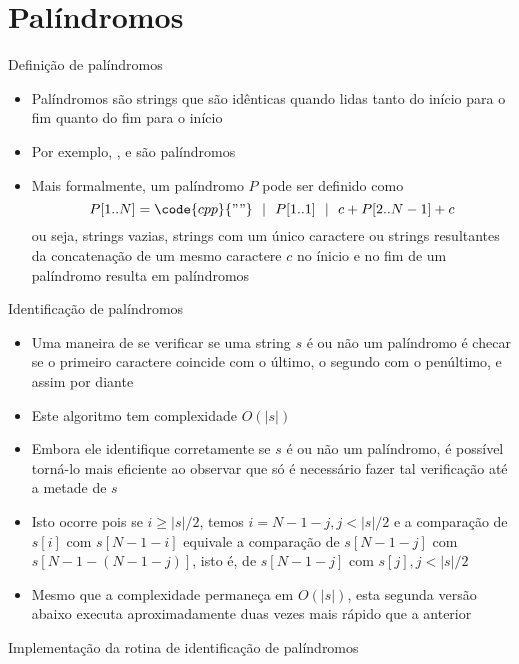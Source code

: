 \section{Palíndromos}

\begin{frame}[fragile]{Definição de palíndromos}

    \begin{itemize}
        \item Palíndromos são strings que são idênticas quando lidas tanto do início para o fim 
            quanto do fim para o início
        \pause

        \item Por exemplo, ,  e  são palíndromos
        \pause

        \item Mais formalmente, um palíndromo $P$ pode ser definido como
        \[
            P[1..N] = \code{cpp}{""}\ \ \vert\ \ P[1..1]\ \ \vert\ \ c + P[2..N-1] + c
        \]
        ou seja, strings vazias, strings com um único caractere ou strings resultantes da concatenação de um mesmo caractere $c$ no ínicio e no fim de um palíndromo resulta em palíndromos

    \end{itemize}

\end{frame}

\begin{frame}[fragile]{Identificação de palíndromos}

    \begin{itemize}
        \item Uma maneira de se verificar se uma string $s$ é ou não um palíndromo é checar se o 
            primeiro caractere coincide com o último, o segundo com o penúltimo, e assim por diante
        \pause

        \item Este algoritmo tem complexidade $O(|s|)$
        \pause

        \item Embora ele identifique corretamente se $s$ é ou não um palíndromo, é possível torná-lo 
            mais eficiente ao observar que só é necessário fazer tal verificação até a metade de $s$
        \pause

        \item Isto ocorre pois se $i \geq |s|/2$, temos $i = N - 1 - j, j < |s|/2$ e a comparação 
            de $s[i]$ com $s[N - 1 - i]$ equivale a comparação de $s[N - 1 - j]$ com 
            $s[N - 1 - (N - 1 - j)]$, isto é, de $s[N - 1 - j]$ com $s[j], j < |s|/2$
        \pause

        \item Mesmo que a complexidade permaneça em $O(|s|)$, esta segunda versão abaixo executa 
            aproximadamente duas vezes mais rápido que a anterior
    \end{itemize}

\end{frame}

\begin{frame}[fragile]{Implementação da rotina de identificação de palíndromos}
\end{frame}
